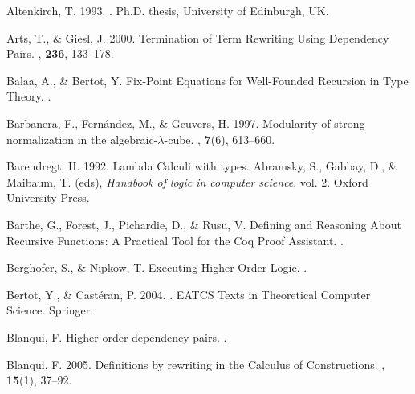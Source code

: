 \begin{thebibliography}{}

Altenkirch, T. 1993.
.
\newblock Ph.D. thesis, University of Edinburgh, UK.

Arts, T., \& Giesl, J. 2000.
\newblock Termination of Term Rewriting Using Dependency Pairs.
, {\bf 236}, 133--178.

Balaa, A., \& Bertot, Y.
\newblock Fix-Point Equations for Well-Founded Recursion in Type Theory.
.

Barbanera, F., Fern{\'a}ndez, M., \& Geuvers, H. 1997.
\newblock Modularity of strong normalization in the algebraic-$\lambda$-cube.
, {\bf 7}(6), 613--660.

Barendregt, H. 1992.
\newblock Lambda Calculi with types.
\newblock  Abramsky, S., Gabbay, D., \& Maibaum, T. (eds), {\em
  Handbook of logic in computer science},  vol. 2.
\newblock Oxford University Press.

Barthe, G., Forest, J., Pichardie, D., \& Rusu, V.
\newblock Defining and Reasoning About Recursive Functions: A Practical Tool
  for the {Coq} Proof Assistant.
.

Berghofer, S., \& Nipkow, T.
\newblock Executing Higher Order Logic.
.

Bertot, Y., \& Cast{\'e}ran, P. 2004.
.
\newblock EATCS Texts in Theoretical Computer Science.
\newblock Springer.

Blanqui, F.
\newblock Higher-order dependency pairs.
.

Blanqui, F. 2005.
\newblock Definitions by rewriting in the Calculus of Constructions.
, {\bf 15}(1), 37--92.


\end{thebibliography}
